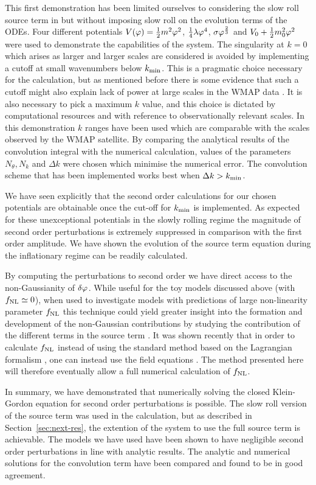 This first demonstration has been limited ourselves to considering
the slow roll source term in  but without imposing
slow roll on the evolution terms of the ODEs. Four different potentials
$V(\varphi)=\frac{1}{2} m^2 \varphi^2$, $\frac{1}{4}\lambda\varphi^4$, $\sigma\varphi^{\frac{2}{3}}$ and $V_0 + \frac{1}{2} m_0^2 \varphi^2$ were
used to demonstrate the capabilities of the
system. The singularity at $k=0$ which arises as larger and larger
scales are considered is avoided by implementing a cutoff at small
wavenumbers below $k_{\mathrm{min}}$. This is a pragmatic choice necessary for
the calculation, but as mentioned before there is some evidence that
such a cutoff might also explain lack of power at large scales in the
WMAP data \cite{spergel, Sinha:2005mn, Kim:2009pf}. It is also necessary to
pick a maximum $k$ value, and this choice is dictated by computational
resources and with reference to observationally relevant scales. In
this demonstration $k$ ranges have been used which are comparable with the
scales observed by the WMAP satellite. By comparing the analytical results of the
convolution integral with the numerical calculation, values of the parameters
$N_\theta, N_k$ and $\Delta k$ were chosen which minimise
the numerical error. The convolution scheme that has been implemented
works best when $\Delta k>k_{\mathrm{min}}$.


We have seen explicitly that the second order calculations for our chosen
potentials are obtainable once the cut-off for $k_{\mathrm{min}}$ is
implemented. As expected for these unexceptional potentials in the slowly
rolling regime the magnitude of second order perturbations is extremely
suppressed in comparison with the first order amplitude. We have shown the
evolution of the source term equation during the inflationary regime can be
readily calculated.


By computing the perturbations to second order we have direct access
to the non-Gaussianity of $\delta\varphi_{}$.  While useful for the toy models
discussed above (with $f_{\mathrm{NL}}\simeq0$), when used to investigate models
with predictions of large non-linearity parameter $f_{\mathrm{NL}}$ this technique
could yield greater insight into the formation and development of the
non-Gaussian contributions by studying the contribution of the different
terms in the source term .
%
It was shown recently that in order to calculate $f_{\mathrm{NL}}$ instead of
using the standard method based on the Lagrangian formalism
\cite{Maldacena:2002vr}, one can instead use the field equations
\cite{Musso:2006pt,Seery:2008qj}. The method presented here will
therefore eventually allow a full numerical calculation of $f_{\mathrm{NL}}$.


In summary, we have demonstrated that numerically solving the closed
Klein-Gordon equation for second order perturbations is possible. The slow roll
version of the source term was used in the calculation, but
as described in Section~\ref{sec:next-res}, the extention of the system to use
the full source term is achievable. The models we have used have been shown to have
negligible second order
perturbations in line with analytic results. The
analytic and numerical solutions for the convolution term have been compared and
found to be in good agreement.
